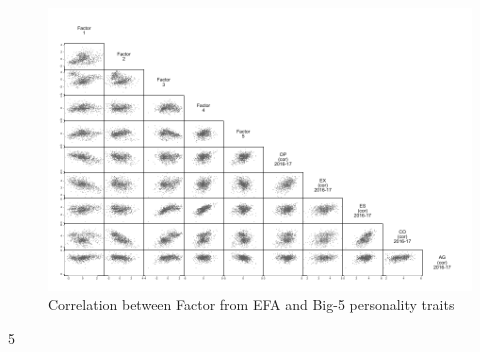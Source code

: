 \documentclass[a4paper, 12pt, onecolumn]{article}
\begin{document}
\begin{figure}[!htb]
\raggedright
\includegraphics[scale=0.85]{INPUT/matrix_b5_efa}
\caption{Correlation between Factor from EFA and Big-5 personality traits}
\label{fig:descXY}
\end{figure}




\clearpage
\newpage
\setcounter{tocdepth}5
\tableofcontents
\end{document}
